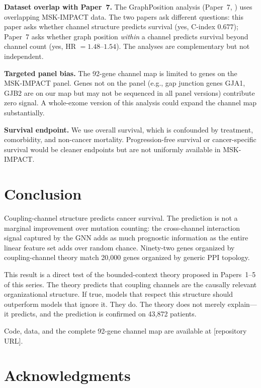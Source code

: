\documentclass[11pt]{article}
\begin{document}
\textbf{Dataset overlap with Paper~7.} The GraphPosition
analysis (Paper~7, \cite{McCarthy2026f}) uses overlapping
MSK-IMPACT data. The two papers ask different questions:
this paper asks whether channel structure predicts survival
(yes, C-index $0.677$); Paper~7 asks whether graph position
\emph{within} a channel predicts survival beyond channel count
(yes, HR $= 1.48$--$1.54$). The analyses are complementary
but not independent.

\textbf{Targeted panel bias.} The 92-gene channel map is
limited to genes on the MSK-IMPACT panel. Genes not on the
panel (e.g., gap junction genes GJA1, GJB2 are on our map but
may not be sequenced in all panel versions) contribute zero
signal. A whole-exome version of this analysis could expand
the channel map substantially.

\textbf{Survival endpoint.} We use overall survival, which
is confounded by treatment, comorbidity, and non-cancer
mortality. Progression-free survival or cancer-specific
survival would be cleaner endpoints but are not uniformly
available in MSK-IMPACT.

\section{Conclusion}
\label{sec:conclusion}

Coupling-channel structure predicts cancer survival. The
prediction is not a marginal improvement over mutation counting:
the cross-channel interaction signal captured by the GNN adds
as much prognostic information as the entire linear feature set
adds over random chance. Ninety-two genes organized by
coupling-channel theory match 20{,}000 genes organized by
generic PPI topology.

This result is a direct test of the bounded-context theory
proposed in Papers~1--5 of this series. The theory predicts
that coupling channels are the causally relevant organizational
structure. If true, models that respect this structure should
outperform models that ignore it. They do. The theory does not
merely explain---it predicts, and the prediction is confirmed
on 43{,}872 patients.

Code, data, and the complete 92-gene channel map are available
at [repository URL].

\section*{Acknowledgments}
\end{document}
